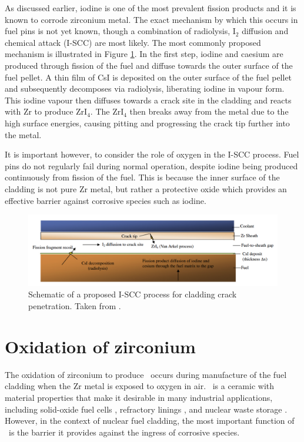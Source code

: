 As discussed earlier, iodine is one of the most prevalent fission products and it is known to corrode zirconium metal. The exact mechanism by which this occurs in fuel pins is not yet known, though a combination of radiolysis, I$_{2}$ diffusion and chemical attack (I-SCC) are most likely. The most commonly proposed mechanism is illustrated in Figure \ref{figure:vanarkel}. In the first step, iodine and caesium are produced through fission of the fuel and diffuse towards the outer surface of the fuel pellet. A thin film of CsI is deposited on the outer surface of the fuel pellet and subsequently decomposes via radiolysis, liberating iodine in vapour form. This iodine vapour then diffuses towards a crack site in the cladding and reacts with Zr to produce ZrI$_{4}$. The ZrI$_{4}$ then breaks away from the metal due to the high surface energies, causing pitting and progressing the crack tip further into the metal.

It is important however, to consider the role of oxygen in the I-SCC process. Fuel pins do not regularly fail during normal operation, despite iodine being produced continuously from fission of the fuel. This is because the inner surface of the cladding is not pure Zr metal, but rather a protective oxide which provides an effective barrier against corrosive species such as iodine.

\begin{figure}[ht]
\centering
\includegraphics[width=\linewidth]{images/vanarkel.png}
\caption[Schematic of a proposed I-SCC process for cladding crack penetration.]{Schematic of a proposed I-SCC process for cladding crack penetration. Taken from \cite{Lewis2011}.}
\label{figure:vanarkel}
\end{figure}

\section{Oxidation of zirconium}

The oxidation of zirconium to produce \zirconia\ occurs during manufacture of the fuel cladding when the Zr metal is exposed to oxygen in air. \zirconia\ is a ceramic with material properties that make it desirable in many industrial applications, including solid-oxide fuel cells \cite{radford1979zirconia}, refractory linings \cite{whittemore1952fused}, and nuclear waste storage \cite{wang2012ceramics}. However, in the context of nuclear fuel cladding, the most important function of \zirconia\ is the barrier it provides against the ingress of corrosive species. 

